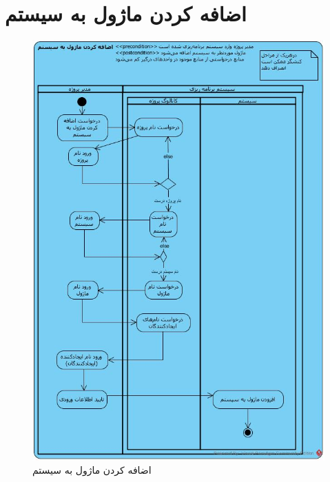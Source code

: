 \section{اضافه کردن ماژول به سیستم}
\begin{figure}[H]
	\centering
	\includegraphics[scale=0.5]{img/activity/AddModuleToSystem}
	\caption{اضافه کردن ماژول به سیستم}
\end{figure}

